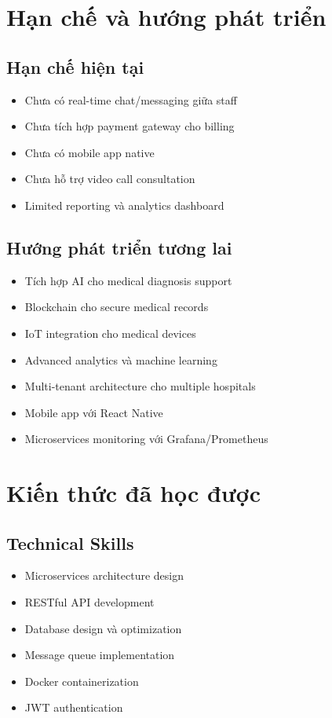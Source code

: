 \documentclass[12pt,a4paper]{report}
\begin{document}
\section{Hạn chế và hướng phát triển}

\subsection{Hạn chế hiện tại}
\begin{itemize}
    \item Chưa có real-time chat/messaging giữa staff
    \item Chưa tích hợp payment gateway cho billing
    \item Chưa có mobile app native
    \item Chưa hỗ trợ video call consultation
    \item Limited reporting và analytics dashboard
\end{itemize}

\subsection{Hướng phát triển tương lai}
\begin{itemize}
    \item Tích hợp AI cho medical diagnosis support
    \item Blockchain cho secure medical records
    \item IoT integration cho medical devices
    \item Advanced analytics và machine learning
    \item Multi-tenant architecture cho multiple hospitals
    \item Mobile app với React Native
    \item Microservices monitoring với Grafana/Prometheus
\end{itemize}

\section{Kiến thức đã học được}
\subsection{Technical Skills}
\begin{itemize}
    \item Microservices architecture design
    \item RESTful API development
    \item Database design và optimization
    \item Message queue implementation
    \item Docker containerization
    \item JWT authentication
\end{itemize}
\end{document}
